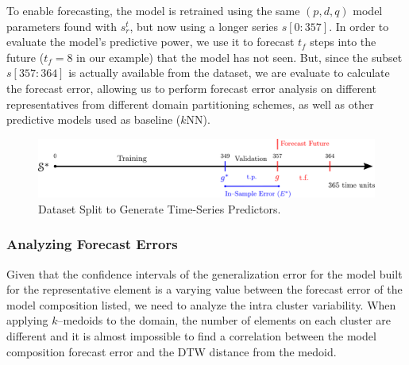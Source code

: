 To enable forecasting, the model is retrained using the same $(p, d, q)$ model parameters found with $s^t_r$, but now using a longer series $s[0:357]$. In order to evaluate the model's predictive power, we use it to forecast $t_f$ steps into the future ($t_f = 8$ in our example) that the model has not seen. But, since the subset $s[357:364]$ is actually available from the dataset, we are evaluate to calculate the forecast error, allowing us to perform forecast error analysis on different representatives from different domain partitioning schemes, as well as other predictive models used as baseline ($k$NN).
 
\begin{figure}[h]
	\centering
	\includegraphics[scale=0.35]{../Figures/ModelRegion_ModelTS}
	\caption{Dataset Split to Generate Time-Series Predictors.}
	\label{Fig:Time-SeriesModel}
\end{figure}

\subsubsection{Analyzing Forecast Errors}

Given that the confidence intervals of the generalization error for the model built for the representative element is a varying value between the forecast error of the model composition listed, we need to analyze the intra cluster variability. When applying $k$--medoids to the domain, the number of elements on each cluster are different and it is almost impossible to find a correlation between the model composition forecast error and the DTW distance from the medoid.


